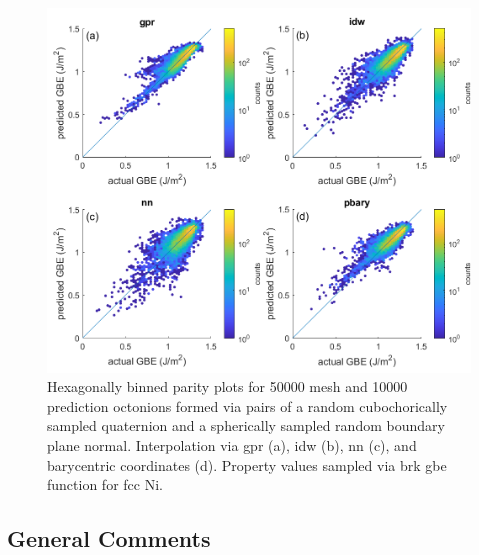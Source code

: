 \documentclass[preprint,12pt]{elsarticle}
\begin{document}
\begin{figure}
    \centering
    \includegraphics{brkparity50000.png}
    \caption{Hexagonally binned parity plots for 50000 mesh and 10000 prediction octonions formed via pairs of a random cubochorically sampled quaternion and a spherically sampled random boundary plane normal. Interpolation via \acrlong{gpr} (a), \acrlong{idw} (b), \acrlong{nn} (c), and barycentric coordinates (d). Property values sampled via \acrlong{brk} \acrlong{gbe} function for \gls{fcc} Ni.}
    \label{fig:brkparity50000}
\end{figure}

\subsection{General Comments}
\end{document}
